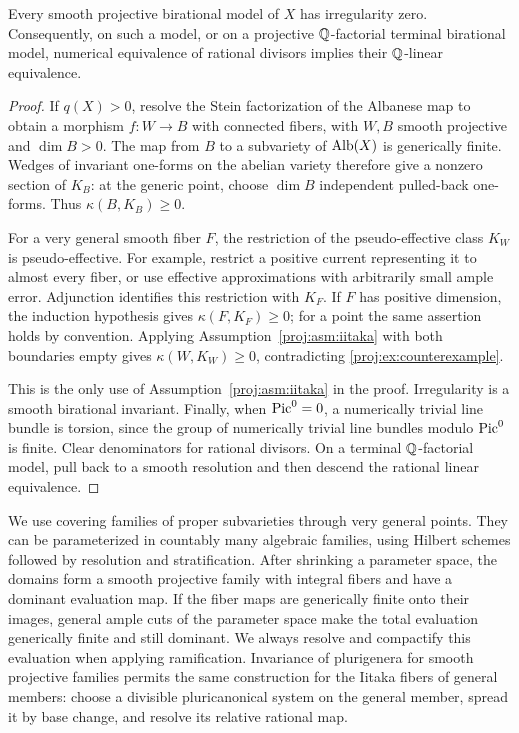 \begin{lemma}\label{proj:ex:irregularity}
Every smooth projective birational model of \(X\) has irregularity zero.
Consequently, on such a model, or on a projective \(\mathbb{Q}\)-factorial
terminal birational model, numerical equivalence of rational divisors
implies their \(\mathbb{Q}\)-linear equivalence.
\end{lemma}
\begin{proof}
If \(q(X)>0\), resolve the Stein factorization of the Albanese map to
obtain a morphism \(f:W\to B\) with connected fibers, with \(W,B\)
smooth projective and \(\dim B>0\). The map from \(B\) to a subvariety
of \(\operatorname{Alb}(X)\) is generically finite. Wedges of invariant one-forms
on the abelian variety therefore give a nonzero section of \(K_B\):
at the generic point, choose \(\dim B\) independent pulled-back
one-forms. Thus \(\kappa(B,K_B)\geq0\).

For a very general smooth fiber \(F\), the restriction of the
pseudo-effective class \(K_W\) is pseudo-effective. For example, restrict
a positive current representing it to almost every fiber, or use
effective approximations with arbitrarily small ample error.
Adjunction identifies this restriction with \(K_F\). If \(F\) has
positive dimension, the induction hypothesis gives
\(\kappa(F,K_F)\geq0\); for a point the same assertion holds by
convention. Applying Assumption~\ref{proj:asm:iitaka} with both boundaries
empty gives \(\kappa(W,K_W)\geq0\), contradicting
\eqref{proj:ex:counterexample}.

This is the only use of Assumption~\ref{proj:asm:iitaka} in the proof.
Irregularity is a smooth birational invariant. Finally, when
\(\operatorname{Pic}^0=0\), a numerically trivial line bundle is torsion, since the
group of numerically trivial line bundles modulo \(\operatorname{Pic}^0\) is
finite. Clear denominators for rational divisors. On a terminal
\(\mathbb{Q}\)-factorial model, pull back to a smooth resolution and then
descend the rational linear equivalence.
\end{proof}

We use covering families of proper subvarieties through very general
points. They can be parameterized in countably many algebraic
families, using Hilbert schemes followed by resolution and
stratification. After shrinking a parameter space, the domains form
a smooth projective family with integral fibers and have a dominant
evaluation map. If the fiber maps are generically finite onto their
images, general ample cuts of the parameter space make the total
evaluation generically finite and still dominant. We always resolve
and compactify this evaluation when applying ramification.
Invariance of plurigenera for smooth projective families
\cite[Theorem~1]{Proj-Paun2007} permits the same construction for the
Iitaka fibers of general members: choose a divisible pluricanonical
system on the general member, spread it by base change, and resolve
its relative rational map.

